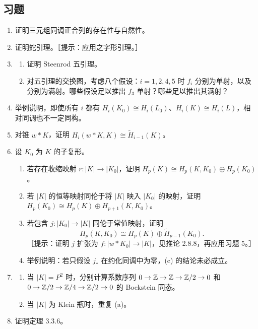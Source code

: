 \subsection*{习题}
\begin{enumerate}
\item 证明三元组同调正合列的存在性与自然性。
\item 证明蛇引理。［提示：应用之字形引理。］
\item \begin{enumerate}[label=(\alph*)]
\item 证明 Steenrod 五引理。
\item 对五引理的交换图，考虑八个假设：$i=1,2,4,5$ 时 $f_i$ 分别为单射，以及分别为满射。哪些假设足以推出 $f_3$ 单射？哪些足以推出其满射？
\end{enumerate}
\item 举例说明，即使所有 $i$ 都有 $H_i(K_0)\cong H_i(L_0)$、$H_i(K)\cong H_i(L)$，相对同调也不一定同构。
\item 对锥 $w*K$，证明 $H_i(w*K,K)\cong\widetilde H_{i-1}(K)$。
\item 设 $K_0$ 为 $K$ 的子复形。
\begin{enumerate}[label=(\alph*)]
\item 若存在收缩映射 $r:|K|\to|K_0|$，证明 $H_p(K)\cong H_p(K,K_0)\oplus H_p(K_0)$。
\item 若 $|K|$ 的恒等映射同伦于将 $|K|$ 映入 $|K_0|$ 的映射，证明 $H_p(K_0)\cong H_p(K)\oplus H_{p+1}(K,K_0)$。
\item 若包含 $j:|K_0|\to|K|$ 同伦于常值映射，证明
\[
H_p(K,K_0)\cong\widetilde H_p(K)\oplus\widetilde H_{p-1}(K_0).
\]
［提示：证明 $j$ 扩张为 $f:|w*K_0|\to|K|$，见推论 2.8.8，再应用习题 5。］
\item[\textasteriskcentered\,(d)] 举例说明：若只假设 $j_*$ 在约化同调中为零，(c) 的结论未必成立。
\end{enumerate}
\item \begin{enumerate}[label=(\alph*)]
\item 当 $|K|=P^2$ 时，分别计算系数序列 $0\to\mathbb{Z}\to\mathbb{Z}\to\mathbb{Z}/2\to0$ 和 $0\to\mathbb{Z}/2\to\mathbb{Z}/4\to\mathbb{Z}/2\to0$ 的 Bockstein 同态。
\item 当 $|K|$ 为 Klein 瓶时，重复 (a)。
\end{enumerate}
\item 证明定理 3.3.6。
\end{enumerate}
